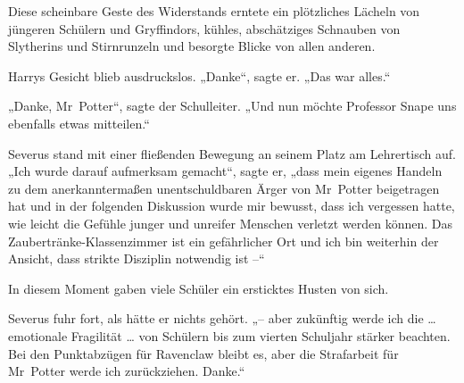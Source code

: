 Diese scheinbare Geste des Widerstands erntete ein plötzliches Lächeln von jüngeren Schülern und Gryffindors, kühles, abschätziges Schnauben von Slytherins und Stirnrunzeln und besorgte Blicke von allen anderen. 

Harrys Gesicht blieb ausdruckslos. „Danke“, sagte er. „Das war alles.“ 

„Danke, Mr~Potter“, sagte der Schulleiter. „Und nun möchte Professor Snape uns ebenfalls etwas mitteilen.“ 

Severus stand mit einer fließenden Bewegung an seinem Platz am Lehrertisch auf. „Ich wurde darauf aufmerksam gemacht“, sagte er, „dass mein eigenes Handeln zu dem anerkanntermaßen unentschuldbaren Ärger von Mr~Potter beigetragen hat und in der folgenden Diskussion wurde mir bewusst, dass ich vergessen hatte, wie leicht die Gefühle junger und unreifer Menschen verletzt werden können. Das Zaubertränke-Klassenzimmer ist ein gefährlicher Ort und ich bin weiterhin der Ansicht, dass strikte Disziplin notwendig ist –“ 

In diesem Moment gaben viele Schüler ein ersticktes Husten von sich. 

Severus fuhr fort, als hätte er nichts gehört. „– aber zukünftig werde ich die … emotionale Fragilität … von Schülern bis zum vierten Schuljahr stärker beachten. Bei den Punktabzügen für Ravenclaw bleibt es, aber die Strafarbeit für Mr~Potter werde ich zurückziehen. Danke.“ 

